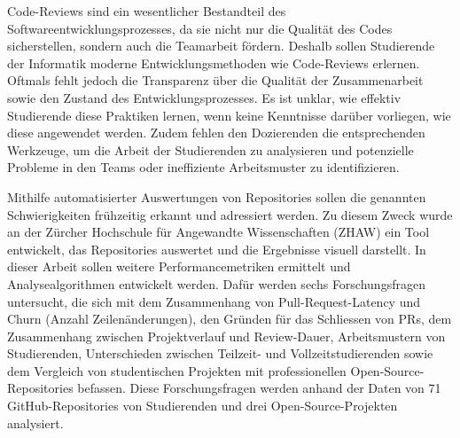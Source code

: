 \begin{extraAbstract}
\addchaptertocentry{\extraabstractname} %
Code-Reviews sind ein wesentlicher Bestandteil des Softwareentwicklungsprozesses, da sie nicht nur die Qualität des Codes sicherstellen, sondern auch die Teamarbeit fördern. Deshalb sollen 
Studierende der Informatik moderne Entwicklungsmethoden wie Code-Reviews erlernen.  Oftmals fehlt jedoch die Transparenz über die Qualität der Zusammenarbeit sowie den Zustand des Entwicklungsprozesses.
Es ist unklar, wie effektiv Studierende diese Praktiken lernen, wenn keine Kenntnisse darüber vorliegen, wie diese angewendet werden. Zudem fehlen den Dozierenden die entsprechenden Werkzeuge, um die Arbeit der Studierenden zu analysieren und potenzielle Probleme in den Teams oder ineffiziente Arbeitsmuster zu identifizieren.

Mithilfe automatisierter Auswertungen von Repositories sollen die genannten \linebreak Schwierigkeiten frühzeitig erkannt und adressiert werden. Zu diesem Zweck wurde an der Zürcher Hochschule für Angewandte Wissenschaften (ZHAW) ein Tool entwickelt, das Repositories auswertet und die Ergebnisse visuell darstellt. In dieser Arbeit sollen weitere Performancemetriken ermittelt und Analysealgorithmen entwickelt werden. Dafür werden sechs Forschungsfragen untersucht, die sich mit dem Zusammenhang von Pull-Request-Latency und Churn (Anzahl Zeilenänderungen), den Gründen für das Schliessen von PRs, dem Zusammenhang zwischen Projektverlauf und Review-Dauer, Arbeitsmustern von Studierenden, Unterschieden zwischen Teilzeit- und Vollzeitstudierenden sowie dem Vergleich von studentischen Projekten mit professionellen Open-Source-Repositories befassen. Diese Forschungsfragen werden anhand der Daten von 71 GitHub-Repositories von Studierenden und drei Open-Source-Projekten analysiert.


\end{extraAbstract}
